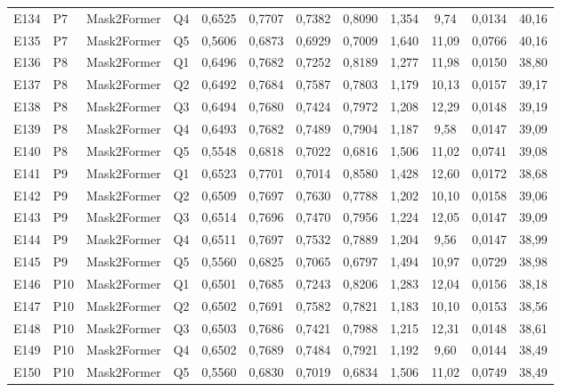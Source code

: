\begin{longtable}{lllllccccccc}
E134 & P7 & Mask2Former & Q4 & 0{,}6525 & 0{,}7707 & 0{,}7382 & 0{,}8090 & 1{,}354 & 9{,}74 & 0{,}0134 & 40{,}16 \\
E135 & P7 & Mask2Former & Q5 & 0{,}5606 & 0{,}6873 & 0{,}6929 & 0{,}7009 & 1{,}640 & 11{,}09 & 0{,}0766 & 40{,}16 \\
E136 & P8 & Mask2Former & Q1 & 0{,}6496 & 0{,}7682 & 0{,}7252 & 0{,}8189 & 1{,}277 & 11{,}98 & 0{,}0150 & 38{,}80 \\
E137 & P8 & Mask2Former & Q2 & 0{,}6492 & 0{,}7684 & 0{,}7587 & 0{,}7803 & 1{,}179 & 10{,}13 & 0{,}0157 & 39{,}17 \\
E138 & P8 & Mask2Former & Q3 & 0{,}6494 & 0{,}7680 & 0{,}7424 & 0{,}7972 & 1{,}208 & 12{,}29 & 0{,}0148 & 39{,}19 \\
E139 & P8 & Mask2Former & Q4 & 0{,}6493 & 0{,}7682 & 0{,}7489 & 0{,}7904 & 1{,}187 & 9{,}58 & 0{,}0147 & 39{,}09 \\
E140 & P8 & Mask2Former & Q5 & 0{,}5548 & 0{,}6818 & 0{,}7022 & 0{,}6816 & 1{,}506 & 11{,}02 & 0{,}0741 & 39{,}08 \\
E141 & P9 & Mask2Former & Q1 & 0{,}6523 & 0{,}7701 & 0{,}7014 & 0{,}8580 & 1{,}428 & 12{,}60 & 0{,}0172 & 38{,}68 \\
E142 & P9 & Mask2Former & Q2 & 0{,}6509 & 0{,}7697 & 0{,}7630 & 0{,}7788 & 1{,}202 & 10{,}10 & 0{,}0158 & 39{,}06 \\
E143 & P9 & Mask2Former & Q3 & 0{,}6514 & 0{,}7696 & 0{,}7470 & 0{,}7956 & 1{,}224 & 12{,}05 & 0{,}0147 & 39{,}09 \\
E144 & P9 & Mask2Former & Q4 & 0{,}6511 & 0{,}7697 & 0{,}7532 & 0{,}7889 & 1{,}204 & 9{,}56 & 0{,}0147 & 38{,}99 \\
E145 & P9 & Mask2Former & Q5 & 0{,}5560 & 0{,}6825 & 0{,}7065 & 0{,}6797 & 1{,}494 & 10{,}97 & 0{,}0729 & 38{,}98 \\
E146 & P10 & Mask2Former & Q1 & 0{,}6501 & 0{,}7685 & 0{,}7243 & 0{,}8206 & 1{,}283 & 12{,}04 & 0{,}0156 & 38{,}18 \\
E147 & P10 & Mask2Former & Q2 & 0{,}6502 & 0{,}7691 & 0{,}7582 & 0{,}7821 & 1{,}183 & 10{,}10 & 0{,}0153 & 38{,}56 \\
E148 & P10 & Mask2Former & Q3 & 0{,}6503 & 0{,}7686 & 0{,}7421 & 0{,}7988 & 1{,}215 & 12{,}31 & 0{,}0148 & 38{,}61 \\
E149 & P10 & Mask2Former & Q4 & 0{,}6502 & 0{,}7689 & 0{,}7484 & 0{,}7921 & 1{,}192 & 9{,}60 & 0{,}0144 & 38{,}49 \\
E150 & P10 & Mask2Former & Q5 & 0{,}5560 & 0{,}6830 & 0{,}7019 & 0{,}6834 & 1{,}506 & 11{,}02 & 0{,}0749 & 38{,}49 \\

\end{longtable}
